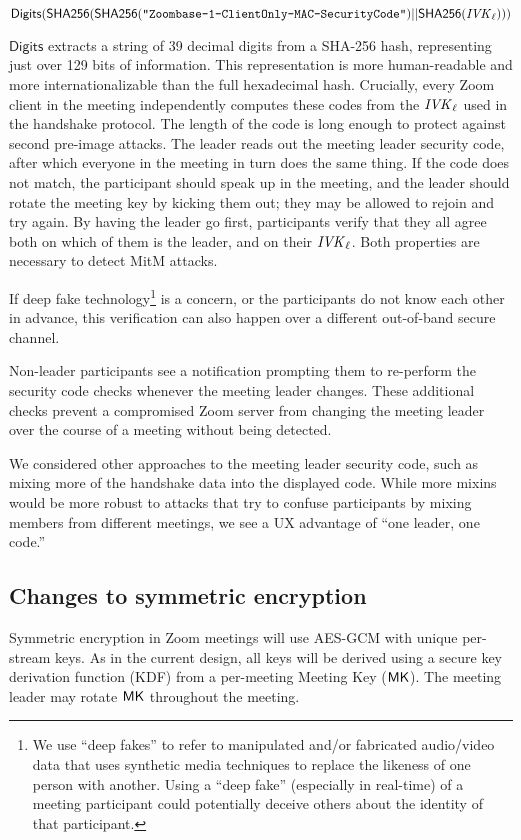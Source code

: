 $$\mathsf{Digits}({\sf SHA256}({\sf SHA256}(\texttt{"Zoombase-1-ClientOnly-MAC-SecurityCode"}) || {\sf SHA256}(\mathit{IVK}_{\ell})))$$

$\mathsf{Digits}$ extracts a string of 39 decimal digits from a SHA-256 hash, representing just over 129 bits of information. This representation is more human-readable and more internationalizable than the full hexadecimal hash. Crucially, every Zoom client in the meeting independently computes these codes from the $\mathit{IVK}_{\ell}$ used in the handshake protocol. The length of the code is long enough to protect against second pre-image attacks. The leader reads out the meeting leader security code, after which everyone in the meeting in turn does the same thing. If the code does not match, the participant should speak up in the meeting, and the leader should rotate the meeting key by kicking them out; they may be allowed to rejoin and try again. By having the leader go first, participants verify that they all agree both on which of them is the leader, and on their $\mathit{IVK}_{\ell}$. Both properties are necessary to detect MitM attacks.

If deep fake technology\footnote{We use ``deep fakes'' to refer to manipulated and/or fabricated audio/video data that uses synthetic media techniques to replace the likeness of one person with another. Using a ``deep fake'' (especially in real-time) of a meeting participant could potentially deceive others about the identity of that participant.} is a concern, or the participants do not know each other in advance, this verification can also happen over a different out-of-band secure channel.

Non-leader participants see a notification prompting them to re-perform the security code checks
whenever the meeting leader changes. These additional checks prevent a compromised Zoom server from
changing the meeting leader over the course of a meeting without being detected.

We considered other approaches to the meeting leader security code, such as mixing more of the handshake data into the displayed code. While more mixins would be more robust to attacks that try to confuse participants by mixing members from different meetings, we see a UX advantage of ``one leader, one code.''

\subsection{Changes to symmetric encryption}
Symmetric encryption in Zoom meetings will use AES-GCM with unique per-stream keys. As in the current design, all keys will be derived using a secure key derivation function (KDF) from a per-meeting Meeting Key (${\sf MK}$). The meeting leader may rotate ${\sf MK}$ throughout the meeting.

